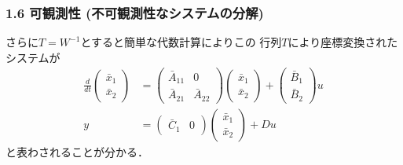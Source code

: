 \documentclass[10pt]{beamer}
\begin{document}
\begin{frame}[t]
\frametitle{1.6 可観測性 (不可観測性なシステムの分解)}
さらに$T=W^{-1}$とすると簡単な代数計算によりこの
行列$T$により座標変換されたシステムが
\begin{align}
 \frac{d}{dt}
  \left(\begin{array}{c}
         \bar{x}_1 \\
   \bar{x}_2
  \end{array}\right)
  &=
  \left(\begin{array}{cc}
         \bar{A}_{11} & 0 \\
   \bar{A}_{21} & \bar{A}_{22}
  \end{array}\right)
  \left(\begin{array}{c}
         \bar{x}_1 \\
   \bar{x}_2
  \end{array}\right)
  +
  \left(\begin{array}{c}
         \bar{B}_1 \\
   \bar{B}_2
  \end{array}\right)
  u \\
 y &=
  \left(\begin{array}{cc}
         \bar{C}_1 & 0
  \end{array}\right)
  \left(\begin{array}{c}
         \bar{x}_1 \\
   \bar{x}_2
  \end{array}\right)
  + D u
\end{align}
と表わされることが分かる．
\end{frame}
\end{document}
